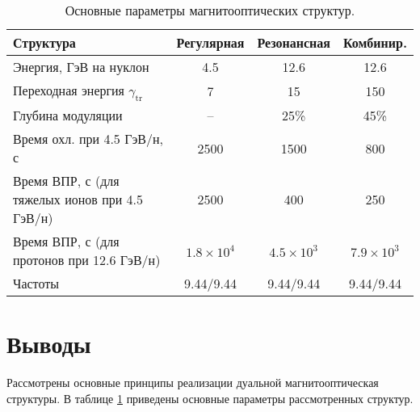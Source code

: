 \begin{table}[h!]
	\centering
	\begin{tabular}{|l|c|c|c|}
		\hline
		\textbf{Структура} & \textbf{Регулярная} & \textbf{Резонансная} & \textbf{Комбинир.} \\
		\hline
		Энергия, ГэВ на нуклон & 4.5 & 12.6 & 12.6 \\
		\hline
		Переходная энергия $\gamma_{\text{tr}}$ & 7 & 15 & 150 \\
		\hline
		Глубина модуляции & -- & 25\% & 45\% \\
		\hline
		Время охл. при 4.5 ГэВ/н, с & 2500 & 1500 & 800 \\
		\hline
		\parbox{6cm}{Время ВПР, с (для тяжелых ионов при 4.5 ГэВ/н)} & 2500 & 400 & 250 \\
		\hline
		\parbox{6cm}{Время ВПР, с (для протонов при 12.6 ГэВ/н)} & $1.8 \times 10^4$ & $4.5 \times 10^3$ & $7.9 \times 10^3$ \\
		\hline
		Частоты & 9.44/9.44 & 9.44/9.44 & 9.44/9.44 \\
		\hline
	\end{tabular}
	\caption{Основные параметры магнитооптических структур.}
	\label{tab:dual}
\end{table}

\section*{Выводы}
\par Рассмотрены основные принципы реализации дуальной магнитооптическая структуры. 
В таблице \ref{tab:dual} приведены основные параметры рассмотренных структур.

